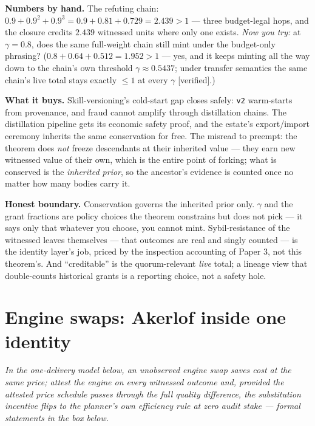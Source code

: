 \documentclass[11pt,a4paper]{article}
\newcommand{\onebreath}[1]{\begin{center}\emph{#1}\end{center}}
\begin{document}
\textbf{Numbers by hand.} The refuting chain: $0.9+0.9^2+0.9^3=0.9+0.81+0.729=2.439>1$ --- three budget-legal hops, and the closure
credits $2.439$ witnessed units where only one exists. \emph{Now you try:} at $\gamma=0.8$, does the same full-weight chain still
mint under the budget-only phrasing? ($0.8+0.64+0.512=1.952>1$ --- yes, and it keeps minting all the way down to the chain's own
threshold $\gamma\approx0.5437$; under transfer semantics the same chain's live total stays exactly $\le 1$ at every $\gamma$
[verified].)







\textbf{What it buys.} Skill-versioning's cold-start gap closes safely: \texttt{v2} warm-starts from provenance, and fraud cannot
amplify through distillation chains. The distillation pipeline gets its economic safety proof, and the estate's export/import
ceremony inherits the same conservation for free. The misread to preempt: the theorem does \emph{not} freeze descendants at their
inherited value --- they earn new witnessed value of their own, which is the entire point of forking; what is conserved is the
\emph{inherited prior}, so the ancestor's evidence is counted once no matter how many bodies carry it.

\begin{boundary}
\textbf{Honest boundary.} Conservation governs the inherited prior only. $\gamma$ and the grant fractions are policy choices the
theorem constrains but does not pick --- it says only that whatever you choose, you cannot mint. Sybil-resistance of the witnessed
leaves themselves --- that outcomes are real and singly counted --- is the identity layer's job, priced by the inspection accounting
of Paper 3, not this theorem's. And ``creditable'' is the quorum-relevant \emph{live} total; a lineage view that double-counts
historical grants is a reporting choice, not a safety hole.
\end{boundary}

\section{Engine swaps: Akerlof inside one identity}\label{sec:engine}

\onebreath{In the one-delivery model below, an unobserved engine swap saves cost at the same price; attest the engine on every witnessed outcome and, provided the attested price
schedule passes through the full quality difference, the substitution incentive flips to the planner's own efficiency rule at
zero audit stake --- formal statements in the box below.}
\end{document}
